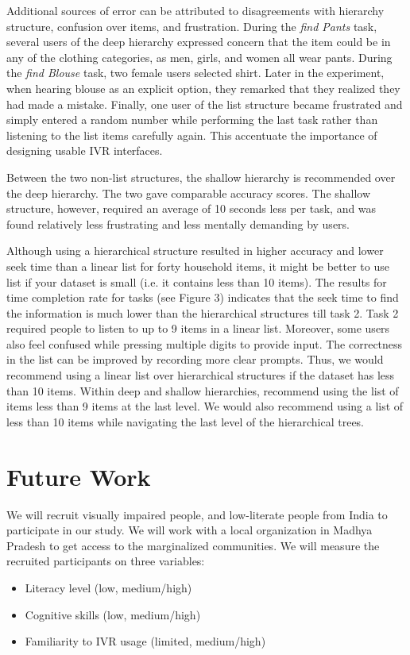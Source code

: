 \documentclass{sigchi}
\begin{document}
Additional sources of error can be attributed to disagreements with hierarchy structure, confusion over items, and frustration. During the \textit{find Pants} task, several users of the deep hierarchy expressed concern that the item could be in any of the clothing categories, as men, girls, and women all wear pants. During the \textit{find Blouse} task, two female users selected shirt. Later in the experiment, when hearing blouse as an explicit option, they remarked that they realized they had made a mistake. Finally, one user of the list structure became frustrated and simply entered a random number while performing the last task rather than listening to the list items carefully again. This accentuate the importance of designing usable IVR interfaces. 

Between the two non-list structures, the shallow hierarchy is recommended over the deep hierarchy. The two gave comparable accuracy scores. The shallow structure, however, required an average of 10 seconds less per task, and was found relatively less frustrating and less mentally demanding by users.

Although using a hierarchical structure resulted in higher accuracy and lower seek time than a linear list for forty household items, it might be better to use list if your dataset is small (i.e. it contains less than 10 items). The results for time completion rate for tasks (see Figure 3) indicates that the seek time to find the information is much lower than the hierarchical structures till task 2. Task 2 required people to listen to up to 9 items in a linear list.  Moreover, some users also feel confused while pressing multiple digits to provide input. The correctness in the list can be improved by recording more clear prompts. Thus, we would recommend using a linear list over hierarchical structures if the dataset has less than 10 items. Within deep and shallow hierarchies, recommend using the list of items less than 9 items at the last level. We would also recommend using a list of less than 10 items while navigating the last level of the hierarchical trees.  


\section{Future Work}
We will recruit visually impaired people, and low-literate people from India to participate in our study. We will work with a local organization in Madhya Pradesh to get access to the marginalized communities. We will measure the recruited participants on three variables:
\begin{itemize}
\item Literacy level (low, medium/high)
\item Cognitive skills (low, medium/high)
\item Familiarity to IVR usage (limited, medium/high)
\end{itemize}
\end{document}
